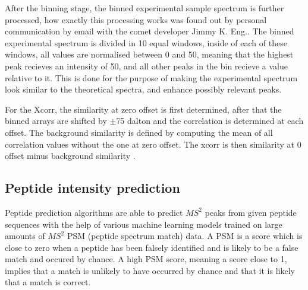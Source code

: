 \documentclass[11pt]{article}
\begin{document}
After the binning stage, the binned experimental sample spectrum is further processed, how exactly this processing works was found out by personal communication by email with the comet developer Jimmy K. Eng.. The binned experimental spectrum is divided in 10 equal windows, inside of each of these windows, all values are normalised between 0 and 50, meaning that the highest peak recieves an intensity of 50, and all other peaks in the bin recieve a value relative to it. This is done for the purpose of making the experimental spectrum look similar to the theoretical spectra, and enhance possibly relevant peaks.

For the Xcorr, the similarity at zero offset is first determined, after that the binned arrays are shifted by $\pm$75 dalton and the correlation is determined at each offset. The background similarity is defined by computing the mean of all correlation values without the one at zero offset. The xcorr is then similarity at 0 offset minus background similarity \cite{xcorr-function}.

\subsection{Peptide intensity prediction}
Peptide prediction algorithms are able to predict \(MS^2\) peaks from given peptide sequences with the help of various machine learning models trained on large amounts of \(MS^2\) PSM (peptide spectrum match) data. A PSM is a score which is close to zero when a peptide has been falsely identified and is likely to be a false match and occured by chance. A high PSM score, meaning a score close to 1, implies that a match is unlikely to have occurred by chance and that it is likely that a match is correct. 
\end{document}
